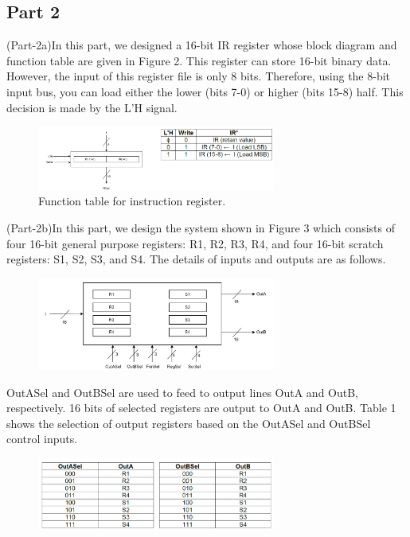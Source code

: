 \documentclass[pdftex,12pt,a4paper]{article}
\begin{document}
\subsection{Part 2}
(Part-2a)In this part, we designed a 16-bit IR register whose block diagram and function table are given
in Figure 2. This register can store 16-bit binary data. However, the input of this register
file is only 8 bits. Therefore, using the 8-bit input bus, you can load either the lower
(bits 7-0) or higher (bits 15-8) half. This decision is made by the L'H signal.
\begin{figure}[htbp]
	\centering
	\includegraphics[width=0.7\textwidth]{Part 2.1 Image}
	\caption{Function table for instruction register.}
\end{figure} \par
(Part-2b)In this part, we design the system shown in Figure 3 which consists of four 16-bit general purpose registers: R1, R2, R3, R4, and four 16-bit scratch registers: S1, S2, S3, and S4. The details of inputs and outputs are as follows.
\begin{figure}[htbp]
	\centering
	\includegraphics[width=0.7\textwidth]{Part 2.2 Image}
\end{figure} \par
OutASel and OutBSel are used to feed to output lines OutA and OutB, respectively. 16 bits of selected registers are output to OutA and OutB. Table 1 shows the selection of output registers based on the OutASel and OutBSel control inputs.
\begin{figure}[htbp]
	\centering
	\includegraphics[width=0.7\textwidth]{Part 2 t1}
\end{figure} \par
\end{document}
